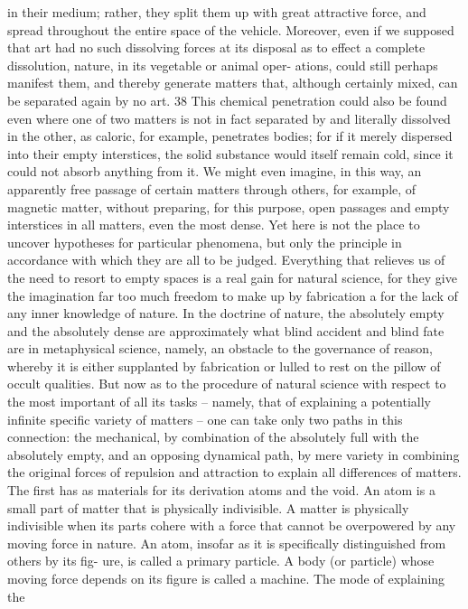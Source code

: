 in their medium; rather, they split them up with great attractive force,
and spread throughout the entire space of the vehicle. Moreover, even
if we supposed that art had no such dissolving forces at its disposal as
to effect a complete dissolution, nature, in its vegetable or animal oper-
ations, could still perhaps manifest them, and thereby generate matters
that, although certainly mixed, can be separated again by no art. 38 This
chemical penetration could also be found even where one of two matters
is not in fact separated by and literally dissolved in the other, as caloric,
for example, penetrates bodies; for if it merely dispersed into their empty
interstices, the solid substance would itself remain cold, since it could
not absorb anything from it. We might even imagine, in this way, an
apparently free passage of certain matters through others, for example,
of magnetic matter, without preparing, for this purpose, open passages
and empty interstices in all matters, even the most dense. Yet here is not
the place to uncover hypotheses for particular phenomena, but only the
principle in accordance with which they are all to be judged. Everything
that relieves us of the need to resort to empty spaces is a real gain for
natural science, for they give the imagination far too much freedom to
make up by fabrication a for the lack of any inner knowledge of nature.
In the doctrine of nature, the absolutely empty and the absolutely dense
are approximately what blind accident and blind fate are in metaphysical
science, namely, an obstacle to the governance of reason, whereby it is
either supplanted by fabrication or lulled to rest on the pillow of occult
qualities.
But now as to the procedure of natural science with respect to the
most important of all its tasks – namely, that of explaining a potentially
inﬁnite speciﬁc variety of matters – one can take only two paths in this
connection: the mechanical, by combination of the absolutely full with
the absolutely empty, and an opposing dynamical path, by mere variety
in combining the original forces of repulsion and attraction to explain
all differences of matters. The ﬁrst has as materials for its derivation
atoms and the void. An atom is a small part of matter that is physically
indivisible. A matter is physically indivisible when its parts cohere with
a force that cannot be overpowered by any moving force in nature. An
atom, insofar as it is speciﬁcally distinguished from others by its ﬁg-
ure, is called a primary particle. A body (or particle) whose moving force
depends on its ﬁgure is called a machine. The mode of explaining the
